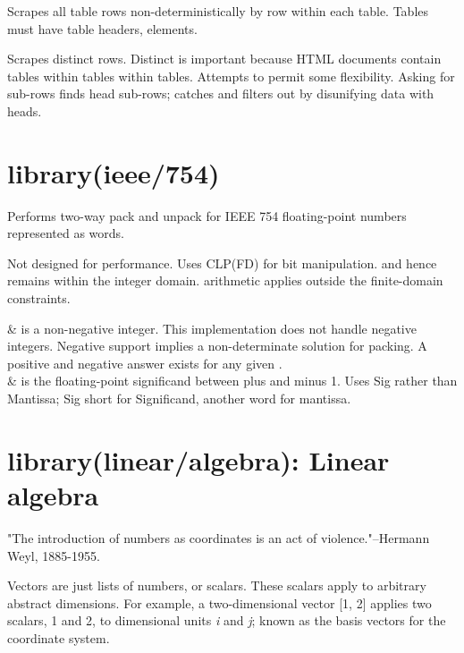 \begin{description}
Scrapes all table rows non-deterministically by row within each
table. Tables must have table headers,  elements.

Scrapes distinct rows. Distinct is important because HTML documents
contain tables within tables within tables. Attempts to permit some
flexibility. Asking for sub-rows finds head sub-rows; catches and
filters out by disunifying data with heads.
\end{description}

\chapter{library(ieee/754)}\label{sec:754}

\begin{description}
\nodescription
Performs two-way pack and unpack for IEEE 754 floating-point numbers
represented as words.

Not designed for performance. Uses CLP(FD) for bit manipulation. and
hence remains within the integer domain.  arithmetic applies
outside the finite-domain constraints.

\begin{arguments}
 & is a non-negative integer. This implementation does not
handle negative integers. Negative support implies a non-determinate
solution for packing. A positive and negative answer exists for any
given . \\
 & is the floating-point significand between plus and minus 1.
Uses Sig rather than Mantissa; Sig short for Significand, another
word for mantissa. \\
\end{arguments}
\end{description}

\chapter{library(linear/algebra): Linear algebra}\label{sec:algebra}

"The introduction of numbers as coordinates is an act of
violence."--Hermann Weyl, 1885-1955.

Vectors are just lists of numbers, or scalars. These scalars apply to
arbitrary abstract dimensions. For example, a two-dimensional vector
[1, 2] applies two scalars, 1 and 2, to dimensional units \textit{i} and
\textit{j}; known as the basis vectors for the coordinate system.

